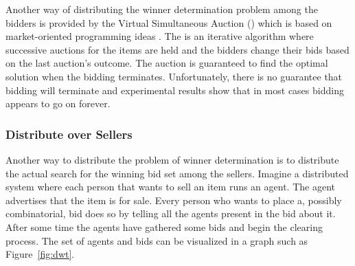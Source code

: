 \medskip

Another way of distributing the winner determination problem among the
bidders is provided by the Virtual Simultaneous Auction ()
\cite{fujishima99a} which is based on market-oriented programming
ideas \cite{wellman96a}. The  is an iterative algorithm
where successive auctions for the items are held and the bidders
change their bids based on the last auction's outcome.  The auction is
guaranteed to find the optimal solution when the bidding terminates.
Unfortunately, there is no guarantee that bidding will terminate and
experimental results show that in most cases bidding appears to go on
forever.

\subsubsection{Distribute over Sellers}
\label{sec:distributed-search}

Another way to distribute the problem of winner determination is to
distribute the actual search for the winning bid set among the
sellers. Imagine a distributed system where each person that wants to
sell an item runs an agent. The agent advertises that the item is for
sale.  Every person who wants to place a, possibly combinatorial, bid
does so by telling all the agents present in the bid about it.  After
some time the agents have gathered some bids and begin the clearing
process. The set of agents and bids can be visualized in a graph such
as Figure~\ref{fig:dwt}.

